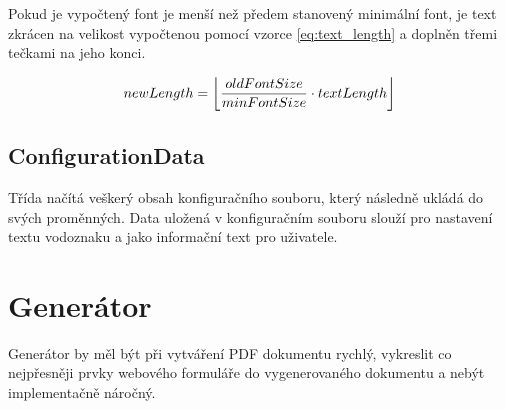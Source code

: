 Pokud je vypočtený font je menší než předem stanovený minimální font, je text zkrácen na velikost vypočtenou pomocí vzorce  \eqref{eq:text_length} a doplněn třemi tečkami na jeho konci. 

\begin{equation}
newLength = \floor*{\frac{oldFontSize}{minFontSize} \cdot textLength} \label{eq:text_length}
\end{equation}
\subsection{ConfigurationData}
Třída načítá veškerý obsah konfiguračního souboru, který následně ukládá do svých proměnných. Data uložená v konfiguračním souboru slouží pro nastavení textu vodoznaku a jako informační text pro uživatele.
\section{Generátor}
Generátor by měl být při vytváření PDF dokumentu rychlý, vykreslit co nejpřesněji prvky webového formuláře do vygenerovaného dokumentu a nebýt implementačně náročný.

